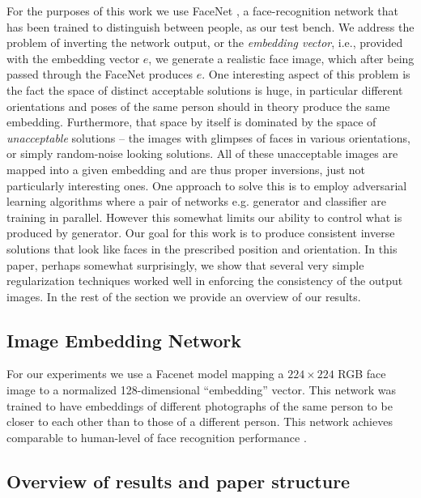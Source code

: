 \documentclass{article}
\def\Emb{e}
\begin{document}
For the purposes of this work we use FaceNet \cite{schroff:15}, a face-recognition network that has been trained to distinguish between people, as our
test bench. We address the problem of inverting the network output, or the {\em embedding vector}, i.e., provided with the embedding vector $\Emb$, we generate a
realistic face image, which after being passed through the FaceNet produces $\Emb$.
One interesting aspect of this problem is the fact the space of distinct acceptable solutions is huge, in particular
different orientations and poses of the same person should in theory produce the same embedding.
Furthermore, that space by itself is dominated by the space of
{\it unacceptable} solutions -- the images with glimpses of faces in various orientations, or simply random-noise \cite{szegedy:13}
looking solutions.
All of these unacceptable images are mapped into a given embedding and are thus proper inversions, just not particularly interesting ones.
One approach to solve this is to employ adversarial learning algorithms \cite{radford:15, goodfellow2014generative} where a pair of networks e.g. generator and classifier
are training in parallel. However this somewhat limits our ability to control what is produced by generator.
Our goal for this work is to produce consistent inverse solutions that look like faces in the prescribed position and orientation.
In this paper, perhaps somewhat surprisingly, we show that several very simple regularization techniques worked well in enforcing the consistency of the output images.
In the rest of the section we provide an overview of our results.

\subsection{Image Embedding Network}

  For our experiments we use a Facenet model \cite{schroff:15} mapping a $224\times 224$ RGB face image to a normalized
  128-dimensional ``embedding'' vector. This network was trained to have embeddings of different photographs of the same
  person to be closer to each other than to those of a different person. This network achieves comparable to human-level of face recognition
  performance \cite{schroff:15}.

  \subsection{Overview of results and paper structure}
\end{document}
